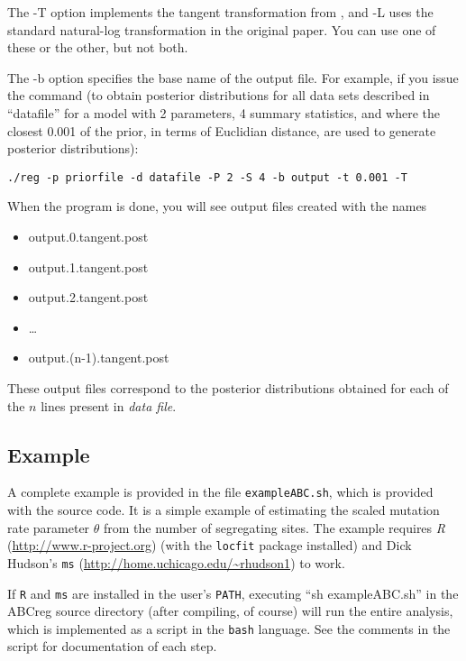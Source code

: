 \documentclass{article}
\begin{document}
The -T option implements the tangent transformation from \cite{hamilton.abc.2005}, and -L uses the standard natural-log transformation in the original \cite{beaumont02ABC} paper.  You can use one of these or the other, but not both.

The -b option specifies the base name of the output file.  For example, if you issue the command (to obtain posterior distributions for all data sets described in ``datafile'' for a model with 2 parameters, 4 summary statistics, and where the closest 0.001 of the prior, in terms of Euclidian distance, are used to generate posterior distributions):

\texttt{./reg -p priorfile -d datafile -P 2 -S 4 -b output -t 0.001 -T}

When the program is done, you will see output files created with the names
\begin{itemize}
\item output.0.tangent.post
\item output.1.tangent.post
\item output.2.tangent.post
\item \ldots
\item output.(n-1).tangent.post
\end{itemize}
These output files correspond to the posterior distributions obtained for each of the $n$ lines present in \textit{data file}.

\subsection*{Example}
A complete example is provided in the file \texttt{exampleABC.sh}, which is provided with the source code.  It is a simple example of estimating the scaled mutation rate parameter $\theta$ from the number of segregating sites.  The example requires \textit{R} (\url{http://www.r-project.org}) (with the \texttt{locfit} package installed) and Dick Hudson's \texttt{ms} (\url{http://home.uchicago.edu/~rhudson1}) to work.

If \texttt{R} and \texttt{ms} are installed in the user's \texttt{PATH}, executing ``sh exampleABC.sh''  in the ABCreg source directory (after compiling, of course) will run the entire analysis, which is implemented as a script in the \texttt{bash} language.  See the comments in the script for documentation of each step.



\end{document}
